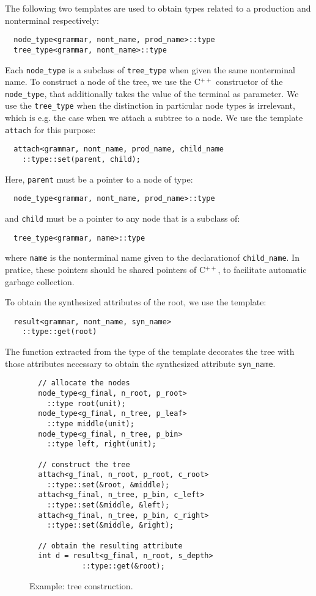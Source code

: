 \documentclass{llncs}
\newcommand*{\Cpp}{C\ensuremath{^{++}}}
\begin{document}
  The following two templates are used to obtain
  types related to a production and nonterminal
  respectively:
  \begin{lstlisting}
  node_type<grammar, nont_name, prod_name>::type
  tree_type<grammar, nont_name>::type
  \end{lstlisting}
  Each \lstinline$node_type$ is a subclass of
  \lstinline$tree_type$ when given the same
  nonterminal name. To construct a node of the
  tree, we use the \Cpp{} constructor of the
  \lstinline$node_type$, that additionally
  takes the value of the terminal as parameter. 
  We use the \lstinline$tree_type$ when the
  distinction in particular node types is
  irrelevant, which is e.g. the case when
  we attach a subtree to a node. We use the
  template \lstinline$attach$ for
  this purpose:
  \begin{lstlisting}
  attach<grammar, nont_name, prod_name, child_name
    ::type::set(parent, child);
  \end{lstlisting}
  Here, \lstinline$parent$ must be a pointer to
  a node of type:
  \begin{lstlisting}
  node_type<grammar, nont_name, prod_name>::type
  \end{lstlisting}
  and \lstinline$child$ must be a pointer to
  any node that is a subclass of:
  \begin{lstlisting}
  tree_type<grammar, name>::type
  \end{lstlisting}
  where \lstinline$name$ is the nonterminal name
  given to the declarationof \lstinline$child_name$.
  In pratice, these pointers should be shared pointers
  of \Cpp, to facilitate automatic garbage collection.
  
  To obtain the synthesized attributes of the root,
  we use the template: 
  \begin{lstlisting}
  result<grammar, nont_name, syn_name>
    ::type::get(root)
  \end{lstlisting}
  The function extracted from the type of the template
  decorates the tree with those attributes necessary to obtain the
  synthesized attribute \lstinline$syn_name$.
  
  \begin{figure}[ht]
  \begin{lstlisting}
  // allocate the nodes
  node_type<g_final, n_root, p_root>
    ::type root(unit);
  node_type<g_final, n_tree, p_leaf>
    ::type middle(unit);
  node_type<g_final, n_tree, p_bin>
    ::type left, right(unit);

  // construct the tree
  attach<g_final, n_root, p_root, c_root>
    ::type::set(&root, &middle);
  attach<g_final, n_tree, p_bin, c_left>
    ::type::set(&middle, &left);
  attach<g_final, n_tree, p_bin, c_right>
    ::type::set(&middle, &right);

  // obtain the resulting attribute
  int d = result<g_final, n_root, s_depth>
            ::type::get(&root);
  \end{lstlisting}
  \caption{Example: tree construction.}
  \label{fig:example:construct}
  \end{figure}
\end{document}
